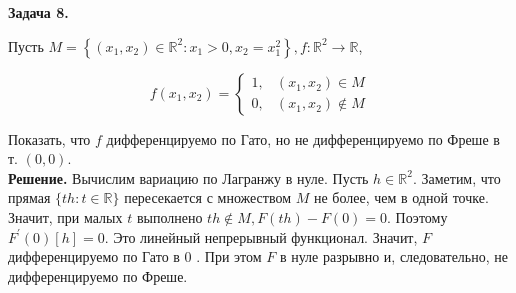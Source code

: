 \begin{task}

\textbf{Задача 8.}

Пусть $M=\left\{\left(x_{1}, x_{2}\right) \in \mathbb{R}^{2}: x_{1}>0, x_{2}=x_{1}^{2}\right\}, f: \mathbb{R}^{2} \rightarrow \mathbb{R}$,

$$
f\left(x_{1}, x_{2}\right)= \begin{cases}1, & \left(x_{1}, x_{2}\right) \in M \\ 0, & \left(x_{1}, x_{2}\right) \notin M\end{cases}
$$

Показать, что $f$ дифференцируемо по Гато, но не дифференцируемо по Фреше в т. $(0,0)$.\\

\textbf{Решение.} Вычислим вариацию по Лагранжу в нуле. Пусть $h \in \mathbb{R}^{2}$. Заметим, что прямая $\{t h: t \in \mathbb{R}\}$ пересекается с множеством $M$ не более, чем в одной точке. Значит, при малых $t$ выполнено $t h \notin M, F(t h)-F(0)=0$. Поэтому $F^{\prime}(0)[h]=0$. Это линейный непрерывный функционал. Значит, $F$ дифференцируемо по Гато в 0 . При этом $F$ в нуле разрывно и, следовательно, не дифференцируемо по Фреше.

\end{task}
